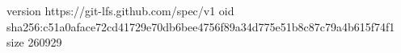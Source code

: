version https://git-lfs.github.com/spec/v1
oid sha256:c51a0aface72cd41729e70db6bee4756f89a34d775e51b8c87c79a4b615f74f1
size 260929
